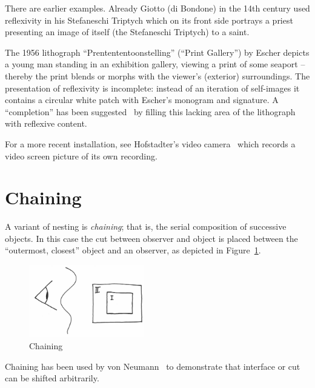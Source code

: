There are earlier examples.
Already  Giotto (di Bondone) in the 14th century used reflexivity in his Stefaneschi Triptych
which on its front side portrays a priest presenting an image of itself (the Stefaneschi Triptych) to a saint.

The 1956 lithograph ``Prentententoonstelling'' (``Print Gallery'') by  Escher
depicts a young
man standing in an exhibition gallery, viewing a print
of some seaport -- thereby the print blends or morphs with the viewer's (exterior) surroundings.
The presentation of reflexivity is incomplete: instead of an iteration of self-images
it contains a
circular
white patch with
Escher's monogram and signature.
A ``completion'' has been suggested~\cite{deSmit-2003} by filling this lacking area of the lithograph with reflexive content.

For a more recent installation, see Hofstadter's video camera~\cite[p.~490]{hofstadter:80}
which records a video screen picture of its own recording.

\section{Chaining}
\label{2016-pu-book-chaining}

A variant of nesting is {\em chaining}; that is, the serial composition of successive objects.
In this case the cut between  observer and object is placed between the ``outermost, closest'' object and an observer,
as depicted in Figure~\ref{2016-pu-book-chapter-eo-figure-chaining}.
\begin{figure}
\begin{center}
\includegraphics[width=5cm,angle=10]{2016-pu-book-chapter-eo-figure-chaining}
\end{center}
\caption{
Chaining
\label{2016-pu-book-chapter-eo-figure-chaining}
}
\end{figure}

Chaining has been used by von Neumann~\cite[Chapter~VI]{v-neumann-49,v-neumann-55}
to demonstrate that interface or cut can be shifted arbitrarily.



